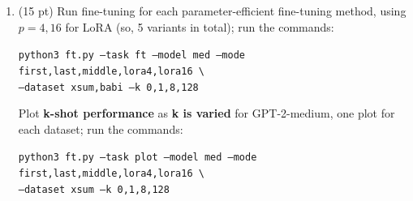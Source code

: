 \documentclass[12pt]{article}
\begin{document}
\begin{enumerate}
\begin{enumerate}
        Saving ratio is $ \frac{d_1*d_2}{p*(d_1+d_2)} $. Saving is greatest when $ p \ll \min(d_1,d_2)$ .

        \item Finish the \texttt{LoRAConv1DWrapper} in \texttt{ft.py}, which wraps a pre-trained Conv1D layer with LoRA parameters. Conv1D is equivalent to a Linear layer; it's a 1D conv because we apply the same linear transform at each time step of the sequence. You can extract the shape of the pre-trained weight matrix from the \texttt{base\_module.weight.shape} tuple. You don't need to worry about biases here, just the low-rank weight matrix residual.
        
        \item Add the corresponding logic for LoRA in \texttt{ft.py:parameters\_to\_fine\_tune()}. Hint: consider using the \texttt{.modules()} function of \texttt{nn.Module} and checking for modules that are an instance of \texttt{LoRAConv1DWrapper}.

        \item Implement the 3-dim version of the loss and accuracy in \texttt{ft.py:get\_loss()} and \texttt{ft.py:get\_acc()}.
        \item Implement batch construction for fine-tuning GPT-2 in function \texttt{ft.py:\allowbreak tokenize\_\allowbreak gpt2\_batch()}. Read the instructions in the code carefully!
        \item Finally, put it all together by filling out the logic for one step of training in \texttt{ft.py:ft\_gpt2()}. Note that we use \textit{gradient accumulation}, meaning that accumulate gradients over \texttt{grad\_accum} steps, and only update our model's parameters after each \texttt{grad\_accum} steps.
    \end{enumerate}
    
    \item (15 pt) Run fine-tuning for each parameter-efficient fine-tuning method, using $p=4,16$ for LoRA (so, 5 variants in total); run the commands:

    {\small \texttt{python3 ft.py --task ft --model med --mode first,last,middle,lora4,lora16 \textbackslash \\
    \phantom{asdf}--dataset xsum,babi --k 0,1,8,128}}

    Plot \textbf{k-shot performance} as \textbf{k is varied} for GPT-2-medium, one plot for each dataset; run the commands:

    {\small \texttt{python3 ft.py --task plot --model med --mode first,last,middle,lora4,lora16 \textbackslash \\
    \phantom{asdf}--dataset xsum --k 0,1,8,128}}


\end{enumerate}
\end{document}
